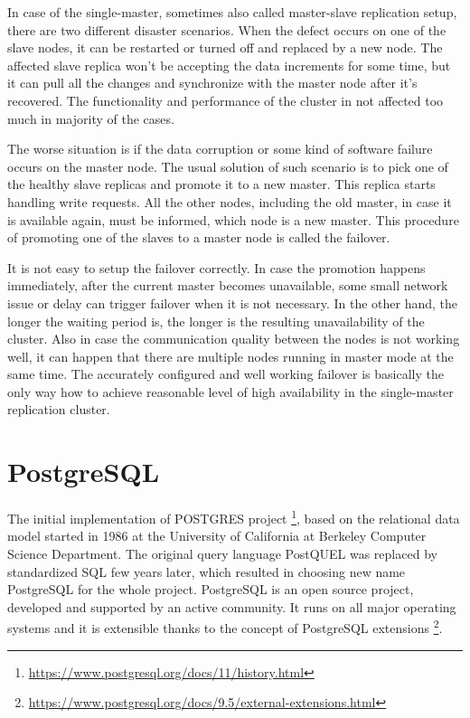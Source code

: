 \documentclass[
  digital, %
  twoside, %
  table,   %
  lof,     %
  lot,     %
]{fithesis3}
\begin{document}
In case of the single-master, sometimes also called master-slave replication setup, there are two different disaster scenarios. When the defect occurs on one of the slave nodes, it can be restarted or turned off and replaced by a new node. The affected slave replica won't be accepting the data increments for some time, but it can pull all the changes and synchronize with the master node after it's recovered. The functionality and performance of the cluster in not affected too much in majority of the cases.

The worse situation is if the data corruption or some kind of software failure occurs on the master node. The usual solution of such scenario is to pick one of the healthy slave replicas and promote it to a new master. This replica starts handling write requests. All the other nodes, including the old master, in case it is available again, must be informed, which node is a new master. This procedure of promoting one of the slaves to a master node is called the failover.

It is not easy to setup the failover correctly. In case the promotion happens immediately, after the current master becomes unavailable, some small network issue or delay can trigger failover when it is not necessary. In the other hand, the longer the waiting period is, the longer is the resulting unavailability of the cluster. Also in case the communication quality between the nodes is not working well, it can happen that there are multiple nodes running in master mode at the same time. The accurately configured and well working failover is basically the only way how to achieve reasonable level of high availability in the single-master replication cluster.

\section{PostgreSQL} \label{sec:postgresql}
The initial implementation of POSTGRES project \footnote{\url{https://www.postgresql.org/docs/11/history.html}}, based on the relational data model started in 1986 at the University of California at Berkeley Computer Science Department. The original query language PostQUEL was replaced by standardized SQL few years later, which resulted in choosing new name PostgreSQL for the whole project. PostgreSQL is an open source project, developed and supported by an active community. It runs on all major operating systems and it is extensible thanks to the concept of PostgreSQL extensions \footnote{\url{https://www.postgresql.org/docs/9.5/external-extensions.html}}.
\end{document}
